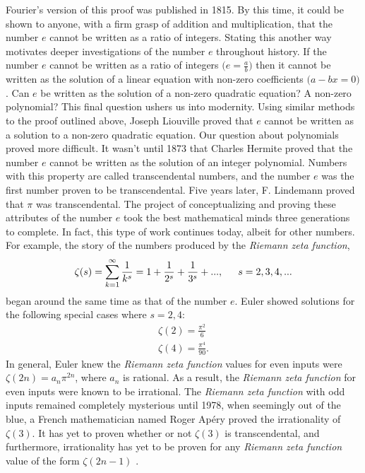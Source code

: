 \documentclass[12pt,oneside]{amsart}
\theoremstyle{definition}
\theoremstyle{remark}
\numberwithin{equation}{exer}
\begin{document}
\indent 
Fourier's version of this proof was published in 1815. By this time, it could be shown to anyone, with a firm grasp of addition and multiplication, that the number $e$ cannot be written as a ratio of integers. Stating this another way motivates deeper investigations of the number $e$ throughout history. If the number $e$ cannot be written as a ratio of integers $\Big(e=\frac{a}{b}\Big)$ then it cannot be written as the solution of a linear equation with non-zero coefficients $\Big(a- bx = 0\Big)$. Can $e$ be written as the solution of a non-zero quadratic equation? A non-zero polynomial?
\newline
\indent 
This final question ushers us into modernity. Using similar methods to the proof outlined above, Joseph Liouville proved that $e$ cannot be written as a solution to a non-zero quadratic equation. Our question about polynomials proved more difficult. It wasn't until 1873 that Charles Hermite proved that the number $e$ cannot be written as the solution of an integer polynomial. Numbers with this property are called transcendental numbers, and the number $e$ was the first number proven to be transcendental. Five years later, F. Lindemann proved that $\pi$ was transcendental.
\newline
\indent
The project of conceptualizing and proving these attributes of the number $e$ took the best mathematical minds three generations to complete. In fact, this type of work continues today, albeit for other numbers. For example, the story of the numbers produced by the \textit{Riemann zeta function},
\begin{align*}
    \zeta (s) = \sum_{k=1}^{\infty} \frac{1}{k^s}= 1 + \frac{1}{2^s}+\frac{1}{3^s}+...,\indent s=2,3,4,...
\end{align*}
began around the same time as that of the number $e$. Euler showed solutions for the following special cases where $s=2,4$:
\begin{align*}
    \zeta(2)=\frac{\pi^2}{6} \\
    \zeta(4) = \frac{\pi^4}{90}.
\end{align*}
In general, Euler knew the \textit{Riemann zeta function} values for even inputs were $\zeta (2n)=a_n \pi^{2n}$, where $a_n$ is rational. As a result, the \textit{Riemann zeta function} for even inputs were known to be irrational. The \textit{Riemann zeta function} with odd inputs remained completely mysterious until 1978, when seemingly out of the blue, a French mathematician named Roger Ap\'ery proved the irrationality of $\zeta (3)$. It has yet to proven whether or not $\zeta(3)$ is transcendental, and furthermore, irrationality has yet to be proven for any \textit{Riemann zeta function} value of the form $\zeta(2n-1)$ \cite{ross}.
\end{document}
